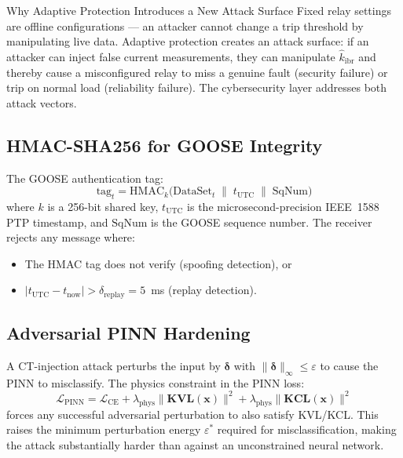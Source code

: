 \documentclass[12pt,a4paper]{article}
\newcommand{\kibrhat}{\hat{k}_\mathrm{ibr}}
\begin{document}
\begin{warnbox}{Why Adaptive Protection Introduces a New Attack Surface}
Fixed relay settings are offline configurations --- an attacker cannot
change a trip threshold by manipulating live data.  Adaptive protection
creates an attack surface: if an attacker can inject false current measurements,
they can manipulate $\kibrhat$ and thereby cause a misconfigured relay to
miss a genuine fault (security failure) or trip on normal load (reliability
failure).  The cybersecurity layer addresses both attack vectors.
\end{warnbox}

\subsection{HMAC-SHA256 for GOOSE Integrity}

The GOOSE authentication tag:
\begin{equation}
  \mathrm{tag}_t = \mathrm{HMAC}_{k}\bigl(\mathrm{DataSet}_t \;\|\; t_\mathrm{UTC} \;\|\; \mathrm{SqNum}\bigr)
  \label{eq:hmac}
\end{equation}
where $k$ is a 256-bit shared key, $t_\mathrm{UTC}$ is the microsecond-precision
IEEE~1588 PTP timestamp, and $\mathrm{SqNum}$ is the GOOSE sequence number.
The receiver rejects any message where:
\begin{itemize}[nosep]
  \item The HMAC tag does not verify (spoofing detection), or
  \item $|t_\mathrm{UTC} - t_\mathrm{now}| > \delta_\mathrm{replay} = 5$~ms (replay detection).
\end{itemize}

\subsection{Adversarial PINN Hardening}

A CT-injection attack perturbs the input by $\bm{\delta}$ with $\|\bm{\delta}\|_\infty \leq \varepsilon$
to cause the PINN to misclassify.  The physics constraint in the PINN loss:
\begin{equation}
  \mathcal{L}_\mathrm{PINN} = \mathcal{L}_\mathrm{CE} + \lambda_\mathrm{phys}
  \|\mathbf{KVL}(\mathbf{x})\|^2 + \lambda_\mathrm{phys}\|\mathbf{KCL}(\mathbf{x})\|^2
  \label{eq:pinn_loss}
\end{equation}
forces any successful adversarial perturbation to also satisfy KVL/KCL.
This raises the minimum perturbation energy $\varepsilon^*$ required for
misclassification, making the attack substantially harder than against an
unconstrained neural network.
\end{document}
